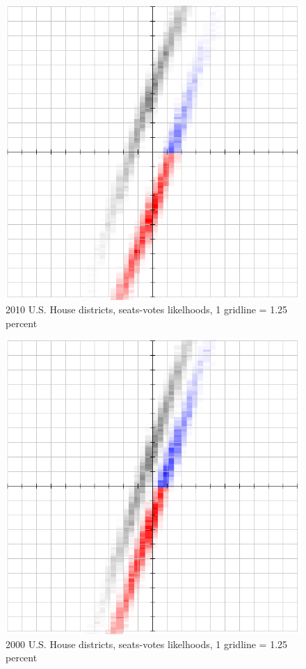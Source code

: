 \documentclass[preprint,12pt]{article}
\begin{document}
\begin{figure}[htb!]
    \begin{center}
        \includegraphics[scale=0.5]{Figures/original_method/2010_ush.png}
        \caption{2010 U.S. House districts, seats-votes likelhoods, 1 gridline = 1.25 percent}\label{fig:2010_ush}
    \end{center}
\end{figure}
\begin{figure}[htb!]
    \begin{center}
        \includegraphics[scale=0.5]{Figures/original_method/2000_ush.png}
        \caption{2000 U.S. House districts, seats-votes likelhoods, 1 gridline = 1.25 percent}\label{fig:2000_ush}
    \end{center}
\end{figure}
\end{document}

